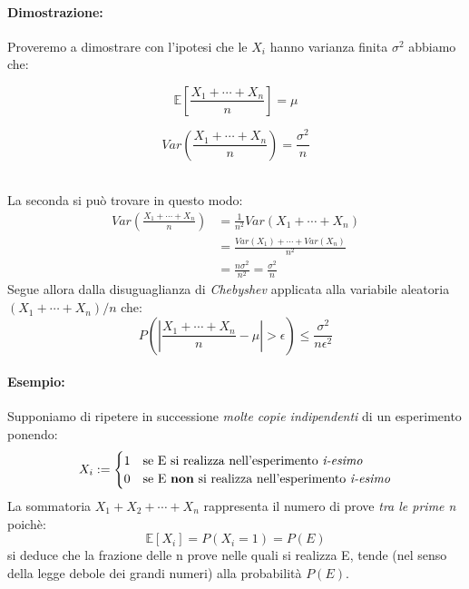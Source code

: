 \documentclass[]{article}
\newcommand{\ev}{\mathbb{E}[X]}
\renewcommand{\ev}[1]{\mathbb{E}[#1]}
\begin{document}
    \paragraph{Dimostrazione:} Proveremo a dimostrare con l'ipotesi che le $X_i$ hanno varianza finita $\sigma^2$ abbiamo che: \\ 
    \begin{minipage}{0.45\textwidth}
        \[ \ev{\frac{X_1 + \cdots + X_n}{n}} = \mu \]
    \end{minipage}
    \begin{minipage}{0.45\textwidth}
        \[ Var(\frac{X_1 + \cdots + X_n}{n}) = \frac{\sigma^2}{n}\]
    \end{minipage} \\
    \linebreak[4]
    La seconda si può trovare in questo modo:
    \begin{equation*}
        \begin{split}
            Var(\frac{X_1 + \cdots + X_n}{n}) & = \frac{1}{n^2} Var(X_1 + \cdots + X_n) \\
            & = \frac{Var(X_1) + \cdots + Var(X_n)}{n^2} \\
            & = \frac{n\sigma^2}{n^2} = \frac{\sigma^2}{n}
        \end{split}
    \end{equation*}
    Segue allora dalla disuguaglianza di \textit{Chebyshev} applicata alla variabile aleatoria $(X_1 + \cdots + X_n)/n$ che:
    \[ P(| \frac{X_1 + \cdots + X_n}{n} - \mu | > \epsilon) \leq \frac{\sigma^2}{n\epsilon^2}\]
    \paragraph{Esempio:} Supponiamo di ripetere in successione \textit{molte copie indipendenti} di un esperimento ponendo:
    \begin{equation*}
        X_i :=
        \begin{cases}
            1 & \text{se E si realizza nell'esperimento \textit{i-esimo}} \\
            0 & \text{se E \textbf{non} si realizza nell'esperimento \textit{i-esimo}}
        \end{cases}
    \end{equation*}
    La sommatoria $X_1 + X_2 + \cdots + X_n$ rappresenta il numero di prove \textit{tra le prime n} poichè:
    \[ \ev{X_i} = P(X_i = 1) = P(E) \]
    si deduce che la frazione delle n prove nelle quali si realizza E, tende (nel senso della
    legge debole dei grandi numeri) alla probabilità $P(E)$.
\end{document}
